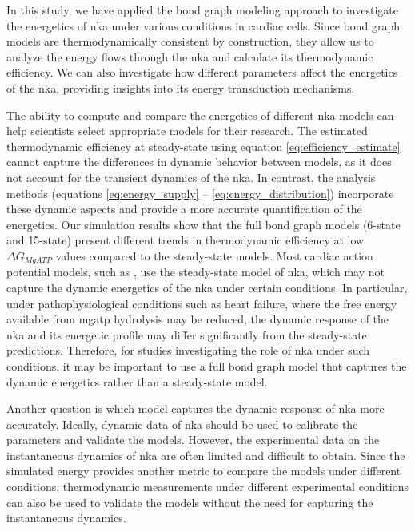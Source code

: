 \documentclass{biophys-new}
\begin{document}
In this study, we have applied the bond graph modeling approach to investigate the energetics of \gls{nka} under various conditions in cardiac cells. Since bond graph models are thermodynamically consistent by construction, they allow us to analyze the energy flows through the \gls{nka} and calculate its thermodynamic efficiency. We can also investigate how different parameters affect the energetics of the \gls{nka}, providing insights into its energy transduction mechanisms. 

The ability to compute and compare the energetics of different \gls{nka} models can help scientists select appropriate models for their research. The estimated thermodynamic efficiency at steady-state using equation \ref{eq:efficiency_estimate} cannot capture the differences in dynamic behavior between models, as it does not account for the transient dynamics of the \gls{nka}. In contrast, the analysis methods (equations \ref{eq:energy_supply} -- \ref{eq:energy_distribution}) incorporate these dynamic aspects and provide a more accurate quantification of the energetics. Our simulation results show that the full bond graph models (6-state and 15-state) present different trends in thermodynamic efficiency at low $\Delta G_{MgATP}$ values compared to the steady-state models. Most cardiac action potential models, such as \cite{faber_action_2000,ten2004model}, use the steady-state model of \gls{nka}, which may not capture the dynamic energetics of the \gls{nka} under certain conditions. In particular, under pathophysiological conditions such as heart failure, where the free energy available from \gls{mgatp} hydrolysis may be reduced, the dynamic response of the \gls{nka} and its energetic profile may differ significantly from the steady-state predictions. Therefore, for studies investigating the role of \gls{nka} under such conditions, it may be important to use a full bond graph model that captures the dynamic energetics rather than a steady-state model.

Another question is which model captures the dynamic response of \gls{nka} more accurately. Ideally, dynamic data of \gls{nka} should be used to calibrate the parameters and validate the models. However, the experimental data on the instantaneous dynamics of \gls{nka} are often limited and difficult to obtain. Since the simulated energy provides another metric to compare the models under different conditions, thermodynamic measurements under different experimental conditions can also be used to validate the models without the need for capturing the instantaneous dynamics. 
\end{document}
